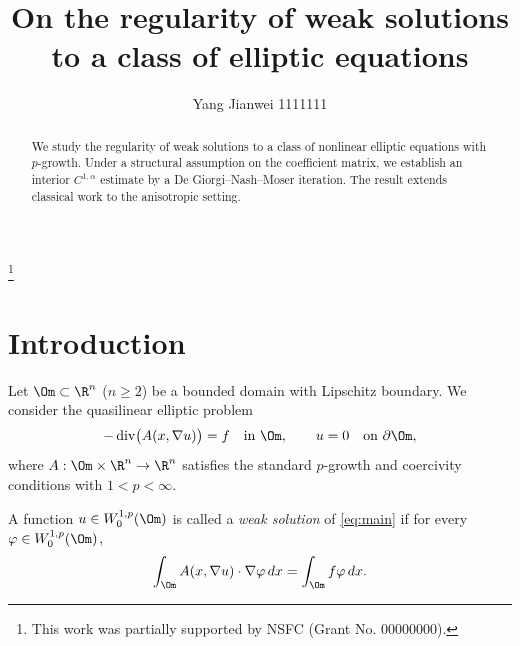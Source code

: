 






\hypersetup{colorlinks=true,linkcolor=blue,citecolor=blue}




















\title[Short title]{On the regularity of weak solutions to a class of elliptic equations}
\author{Yang Jianwei       1111111}


\thanks{This work was partially supported by NSFC (Grant No. 00000000).}



\begin{abstract}
We study the regularity of weak solutions to a class of nonlinear elliptic
equations with $p$-growth. Under a structural assumption on the coefficient
matrix, we establish an interior $C^{1,\alpha}$ estimate by a De Giorgi--Nash--Moser
iteration. The result extends classical work to the anisotropic setting.
\end{abstract}

\maketitle

\section{Introduction}\label{sec:intro}

Let $\Om\subset\R^n$ ($n\ge 2$) be a bounded domain with Lipschitz boundary.
We consider the quasilinear elliptic problem
\begin{equation}\label{eq:main}
  -\operatorname{div}\bigl(A(x,\nabla u)\bigr)=f \quad \text{in } \Om,
  \qquad u=0 \quad \text{on } \partial\Om ,
\end{equation}
where $A:\Om\times\R^n\to\R^n$ satisfies the standard $p$-growth and
coercivity conditions with $1<p<\infty$.

\begin{definition}\label{def:weak}
A function $u\in W^{1,p}_0(\Om)$ is called a \emph{weak solution} of
\eqref{eq:main} if for every $\varphi\in W^{1,p}_0(\Om)$,
\begin{equation}\label{eq:weak}
  \int_{\Om} A(x,\nabla u)\cdot\nabla\varphi\,dx
  = \int_{\Om} f\varphi\,dx .
\end{equation}
\end{definition}

